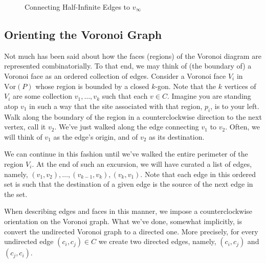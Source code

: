 \documentclass[12pt,twoside]{reedthesis}
\begin{document}
      \begin{figure}[!htb]
        \centering
        
        \caption{Connecting Half-Infinite Edges to $v_{\infty}$}
        \label{fig:vertex_at_infinity}
      \end{figure}

    \subsection{Orienting the Voronoi Graph}
    \label{sub:voronoi_orient}
      Not much has been said about how the faces (regions) of the Voronoi diagram are represented combinatorially. To that end, we may think of (the boundary of) a Voronoi face as an ordered collection of edges. Consider a Voronoi face $V_{i}$ in $\mbox{Vor}(P)$ whose region is bounded by a closed $k$-gon. Note that the $k$ vertices of $V_{i}$ are some collection $v_{1}, \ldots, v_{k}$ such that each $v \in C$. Imagine you are standing atop $v_{1}$ in such a way that the site associated with that region, $p_{i}$, is to your left. Walk along the boundary of the region in a counterclockwise direction to the next vertex, call it $v_{2}$. We've just walked along the edge connecting $v_{1}$ to $v_{2}$. Often, we will think of $v_{1}$ as the edge's origin, and of $v_{2}$ as its destination.\par

      We can continue in this fashion until we've walked the entire perimeter of the region $V_{i}$. At the end of such an excursion, we will have curated a list of edges, namely, $(v_{1}, v_{2}), \ldots, (v_{k-1}, v_{k}), (v_{k}, v_{1})$. Note that each edge in this ordered set is such that the destination of a given edge is the source of the next edge in the set.\par

      When describing edges and faces in this manner, we impose a counterclockwise orientation on the Voronoi graph. What we've done, somewhat implicitly, is convert the undirected Voronoi graph to a directed one. More precisely, for every undirected edge $(c_{i}, c_{j}) \in C$ we create two directed edges, namely, $(c_{i}, c_{j})$ and $(c_{j}, c_{i})$. \par
\end{document}
